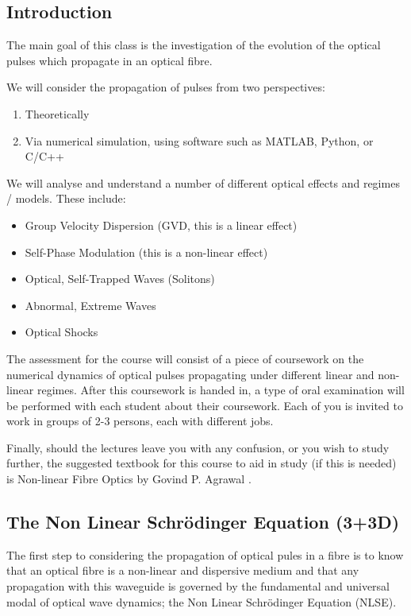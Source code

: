 \documentclass[colorlinks,11pt,a4paper,normalphoto,withhyper,ragged2e]{altareport}
\begin{document}
	\subsection{Introduction}
	The main goal of this class is the investigation of the evolution of the optical pulses which propagate in an optical fibre. \linebreak
	
	We will consider the propagation of pulses from two perspectives:
	\begin{enumerate}[leftmargin=1cm]
		\item Theoretically
		\item Via numerical simulation, using software such as MATLAB, Python, or C/C++
	\end{enumerate}
	
	\vspace{5mm}
	
	We will analyse and understand a number of different optical effects and regimes / models. These include:
	\begin{itemize}[leftmargin=1cm]
		\item Group Velocity Dispersion (GVD, this is a linear effect)
		\item Self-Phase Modulation (this is a non-linear effect)
		\item Optical, Self-Trapped Waves (Solitons)
		\item Abnormal, Extreme Waves
		\item Optical Shocks
	\end{itemize}
	
	\vspace{5mm}
	
	The assessment for the course will consist of a piece of coursework on the numerical dynamics of optical pulses propagating under different linear and non-linear regimes.
	After this coursework is handed in, a type of oral examination will be performed with each student about their coursework. \linebreak
	Each of you is invited to work in groups of 2-3 persons, each with different jobs. \linebreak
	
	Finally, should the lectures leave you with any confusion, or you wish to study further, the suggested textbook for this course to aid in study (if this is needed) is Non-linear Fibre Optics by Govind P. Agrawal \cite{nl_fibre_optics}.


	\pagebreak


	\subsection{The Non Linear Schr\"{o}dinger Equation (3+3D)}
	The first step to considering the propagation of optical pules in a fibre is to know that an optical fibre is a non-linear and dispersive medium and that any propagation with this waveguide is governed by the fundamental and universal modal of optical wave dynamics; the Non Linear Schr\"{o}dinger Equation (NLSE). \linebreak
	
\end{document}

